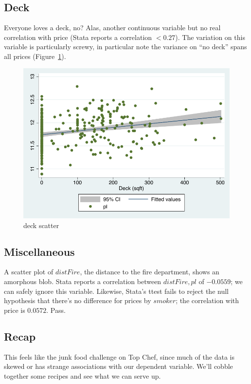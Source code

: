 \documentclass[twocolumn,11pt]{article}
\begin{document}

\subsection*{Deck}
Everyone loves a deck, no?
Alas, another continuous variable but no real correlation with price (Stata reports a correlation $<0.27$).
The variation on this variable is particularly screwy,
in particular note the variance on ``no deck'' spans all prices (Figure~\ref{fig:deck-scatter}).
\begin{figure}[H]
  \includegraphics[width=.9\linewidth]{figures/deck-scatter}
  \caption{deck scatter}
  \label{fig:deck-scatter}
\end{figure}


\subsection*{Miscellaneous}
A scatter plot of $distFire$, the distance to the fire department,
shows an amorphous blob.
Stata reports a correlation between $distFire, pl$ of $-0.0559$;
we can safely ignore this variable.
Likewise, Stata's ttest fails to reject the null hypothesis
that there's no difference for prices by $smoker$; the correlation with price is $0.0572$. Pass.



\subsection*{Recap}
This feels like the junk food challenge on Top Chef,
since much of the data is skewed or has strange associations with our dependent variable.
We'll cobble together some recipes and see what we can serve up.
\end{document}
